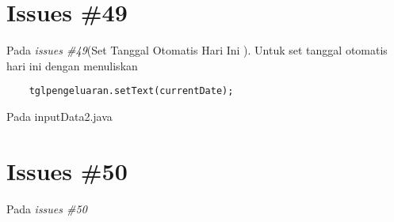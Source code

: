 \section{Issues \#49}
Pada \textit{issues \#49}(Set Tanggal Otomatis Hari Ini ).
Untuk set tanggal otomatis hari ini dengan menuliskan 
\begin{verbatim}
    tglpengeluaran.setText(currentDate);
\end{verbatim}
Pada inputData2.java

\section{Issues \#50}
Pada \textit{issues \#50}